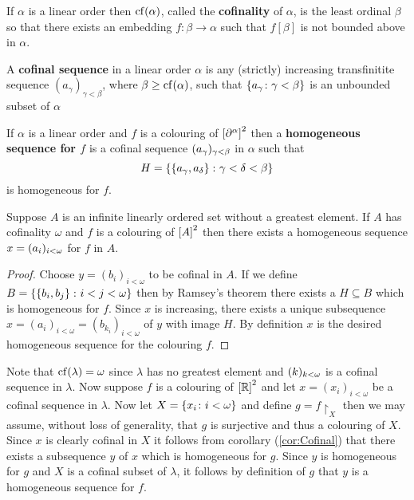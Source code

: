 \begin{dfn}[Cofinality]
	If $\alpha$ is a linear order then $\cf(\alpha)$, called the \textbf{cofinality} of $\alpha$, is the least ordinal $\beta$ so that there exists an embedding $f\colon\beta\to\alpha$ such that $f[\beta]$ is not bounded above in $\alpha$.
\end{dfn}

\begin{dfn}
	A \textbf{cofinal sequence} in a linear order $\alpha$ is any (strictly) increasing transfinitite sequence $(a_\gamma)_{\gamma<\beta}$, where $\beta\geq\cf(\alpha)$, such that $\setbuild{a_\gamma}{\gamma<\beta}$ is an unbounded subset of $\alpha$
\end{dfn}

\begin{dfn}
	If $\alpha$ is a linear order and $f$ is a colouring of $\subsets{2}{\domain\alpha}$ then a \textbf{homogeneous sequence for $f$} is a cofinal sequence $\family{a_\gamma}{\gamma<\beta}$ in $\alpha$ such that
	\begin{equation}
		H=\setbuild{\set{a_\gamma,a_\delta}}{\gamma<\delta<\beta}
	\end{equation}
	is homogeneous for $f$.
\end{dfn}

\begin{cor}\label{cor:Cofinal}
	Suppose $A$ is an infinite linearly ordered set without a greatest element. If $A$ has cofinality $\omega$ and $f$ is a colouring of $\subsets{2}{A}$ then there exists a homogeneous sequence $x=\family{a_i}{i<\omega}$ for $f$ in $A$.
\end{cor}

\begin{proof}
	Choose $y=(b_i)_{i<\omega}$ to be cofinal in $A$.  If we define $B=\setbuild{\set{b_i,b_j}}{i<j<\omega}$ then by Ramsey's theorem there exists a $H\subseteq B$ which is homogeneous for $f$.  Since $x$ is increasing, there exists a unique subsequence $x=(a_i)_{i<\omega}=(b_{k_i})_{i<\omega}$ of $y$ with image $H$.  By definition $x$ is the desired homogeneous sequence for the colouring $f$.
\end{proof}

\begin{exm}
	Note that $\cf(\lambda)=\omega$ since $\lambda$ has no greatest element and $\family{k}{k<\omega}$ is a cofinal sequence in $\lambda$.  Now suppose $f$ is a colouring of $\subsets{2}{\reals}$ and let $x=(x_i)_{i<\omega}$ be a cofinal sequence in $\lambda$.  Now let $X=\setbuild{x_i}{i<\omega}$ and define $g=f\restriction_X$ then we may assume, without loss of generality, that $g$ is surjective and thus a colouring of $X$.  Since $x$ is clearly cofinal in $X$ it follows from corollary (\ref{cor:Cofinal}) that there exists a subsequence $y$ of $x$ which is homogeneous for $g$.  Since $y$ is homogeneous for $g$ and $X$ is a cofinal subset of $\lambda$, it follows by definition of $g$ that $y$ is a homogeneous sequence for $f$.
\end{exm}




